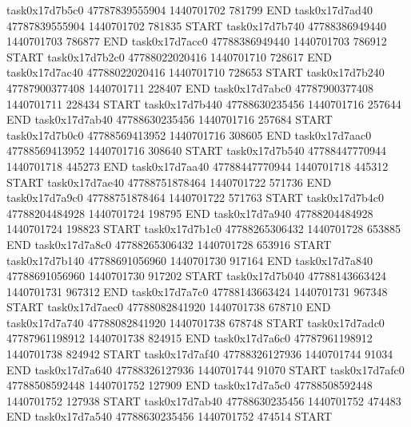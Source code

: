 task0x17d7b5c0 47787839555904          1440701702               781799  END
task0x17d7ad40 47787839555904          1440701702               781835  START
task0x17d7b740 47788386949440          1440701703               786877  END
task0x17d7acc0 47788386949440          1440701703               786912  START
task0x17d7b2c0 47788022020416          1440701710               728617  END
task0x17d7ac40 47788022020416          1440701710               728653  START
task0x17d7b240 47787900377408          1440701711               228407  END
task0x17d7abc0 47787900377408          1440701711               228434  START
task0x17d7b440 47788630235456          1440701716               257644  END
task0x17d7ab40 47788630235456          1440701716               257684  START
task0x17d7b0c0 47788569413952          1440701716               308605  END
task0x17d7aac0 47788569413952          1440701716               308640  START
task0x17d7b540 47788447770944          1440701718               445273  END
task0x17d7aa40 47788447770944          1440701718               445312  START
task0x17d7ae40 47788751878464          1440701722               571736  END
task0x17d7a9c0 47788751878464          1440701722               571763  START
task0x17d7b4c0 47788204484928          1440701724               198795  END
task0x17d7a940 47788204484928          1440701724               198823  START
task0x17d7b1c0 47788265306432          1440701728               653885  END
task0x17d7a8c0 47788265306432          1440701728               653916  START
task0x17d7b140 47788691056960          1440701730               917164  END
task0x17d7a840 47788691056960          1440701730               917202  START
task0x17d7b040 47788143663424          1440701731               967312  END
task0x17d7a7c0 47788143663424          1440701731               967348  START
task0x17d7aec0 47788082841920          1440701738               678710  END
task0x17d7a740 47788082841920          1440701738               678748  START
task0x17d7adc0 47787961198912          1440701738               824915  END
task0x17d7a6c0 47787961198912          1440701738               824942  START
task0x17d7af40 47788326127936          1440701744                91034  END
task0x17d7a640 47788326127936          1440701744                91070  START
task0x17d7afc0 47788508592448          1440701752               127909  END
task0x17d7a5c0 47788508592448          1440701752               127938  START
task0x17d7ab40 47788630235456          1440701752               474483  END
task0x17d7a540 47788630235456          1440701752               474514  START
